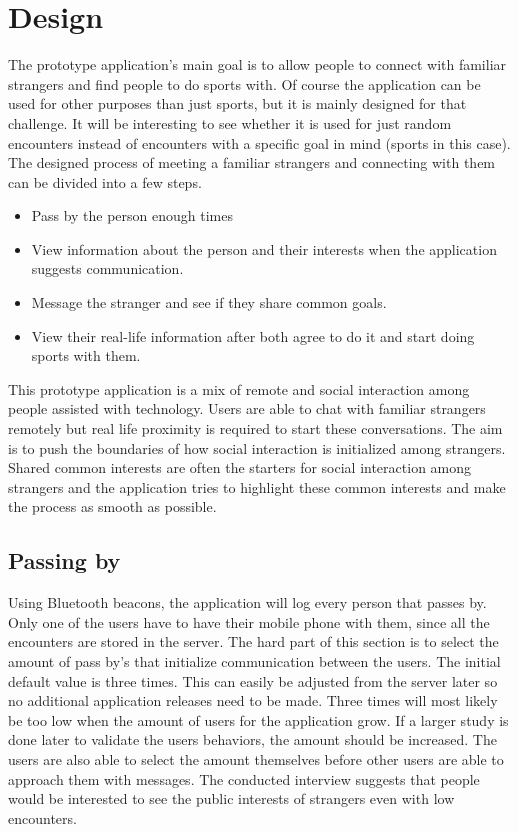 \section{Design}

The prototype application's main goal is to allow people to connect with familiar strangers and find people to do sports with. Of course the application can be used for other purposes than just sports, but it is mainly designed for that challenge. It will be interesting to see whether it is used for just random encounters instead of encounters with a specific goal in mind (sports in this case). The designed process of meeting a familiar strangers and connecting with them can be divided into a few steps.

\begin{itemize}
	\item Pass by the person enough times
	\item View information about the person and their interests when the application suggests communication.
	\item Message the stranger and see if they share common goals.
	\item View their real-life information after both agree to do it and start doing sports with them.
\end{itemize}

This prototype application is a mix of remote and social interaction among people assisted with technology. Users are able to chat with familiar strangers remotely but real life proximity is required to start these conversations. The aim is to push the boundaries of how social interaction is initialized among strangers. Shared common interests are often the starters for social interaction among strangers and the application tries to highlight these common interests and make the process as smooth as possible.

\subsection{Passing by}

Using Bluetooth beacons, the application will log every person that passes by. Only one of the users have to have their mobile phone with them, since all the encounters are stored in the server. The hard part of this section is to select the amount of pass by's that initialize communication between the users. The initial default value is three times. This can easily be adjusted from the server later so no additional application releases need to be made. Three times will most likely be too low when the amount of users for the application grow. If a larger study is done later to validate the users behaviors, the amount should be increased. The users are also able to select the amount themselves before other users are able to approach them with messages. The conducted interview suggests that people would be interested to see the public interests of strangers even with low encounters.


